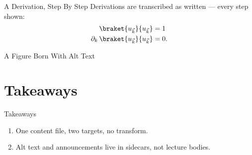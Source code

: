 \begin{frame}{A Derivation, Step By Step}
  Derivations are transcribed as written — every step shown:
  \begin{align*}
    \braket{u_{\vec k}}{u_{\vec k}} &= 1 \\
    \partial_{k}\,\braket{u_{\vec k}}{u_{\vec k}} &= 0 .
  \end{align*}
\end{frame}

\begin{frame}{A Figure Born With Alt Text}
\end{frame}

\section{Takeaways}

\begin{frame}{Takeaways}
  \begin{enumerate}
    \item One content file, two targets, no transform.
    \item Alt text and announcements live in sidecars, not lecture bodies.
  \end{enumerate}
\end{frame}
